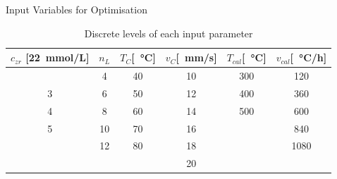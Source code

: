 \documentclass[hyperref={pdfpagelabels=false}, aspectratio=43, t]{beamer}  %
\begin{document}
\begin{frame}{Input Variables for Optimisation}
\begin{table}[htb]
	\centering
	\begin{tabular}{cc cc cc}
		\hline\hline
		$c_{zr}$ [\SI{22}{\milli\mol/\liter}]	&$n_L$	&$T_{C}$[\SI{}{\degreeCelsius}]	&$v_{C}$[\SI{}{\milli\meter/\second}]	&$T_{cal}$[\SI{}{\degreeCelsius}]	&$v_{cal}$[\SI{}{\degreeCelsius/\hour}]	\\
		\hline
		\pause
		2				&4		&40					&10				&300				&120	\\
		3				&6		&50					&12				&400				&360	\\
		4				&8		&60					&14				&500				&600	\\
		5				&10		&70					&16				&					&840	\\
						&12		&80					&18				&					&1080	\\
						&		&					&20				&					&		\\
		\hline\hline
	\end{tabular}
	\caption{Discrete levels of each input parameter }
	\label{tab:input}
\end{table}
\end{frame}
\end{document}
